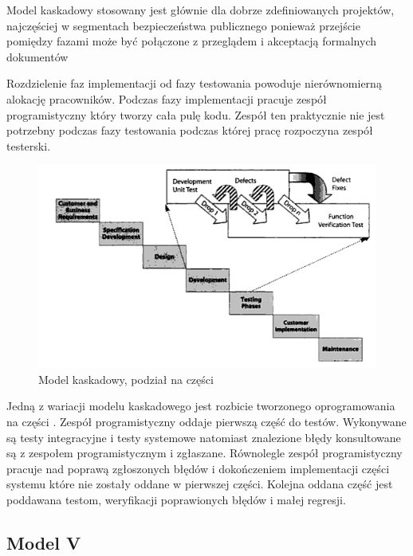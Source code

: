 Model kaskadowy stosowany jest głównie dla dobrze zdefiniowanych projektów, najczęściej w segmentach bezpieczeństwa publicznego ponieważ przejście pomiędzy fazami może być połączone z przeglądem i akceptacją formalnych dokumentów

Rozdzielenie faz implementacji od fazy testowania powoduje nierównomierną alokację pracowników. Podczas fazy implementacji pracuje zespół programistyczny który tworzy cała pulę kodu. Zespół ten praktycznie nie jest potrzebny podczas fazy testowania podczas której pracę rozpoczyna zespół testerski.
\begin{figure}[h]
\centerline{\includegraphics[scale=0.5]{img/water-wheel.png}}
\caption{Model kaskadowy, podział na części  \cite{TestingMatt}}
\label{fig:kaskadowyCzesci}
\end{figure}

Jedną z wariacji modelu kaskadowego jest rozbicie tworzonego oprogramowania na części \cite{TestingMatt}. 
Zespół programistyczny oddaje pierwszą część do testów. Wykonywane są testy integracyjne i testy systemowe natomiast znalezione błędy konsultowane są z zespołem programistycznym i zgłaszane. Równolegle zespół programistyczny pracuje nad poprawą zgłoszonych błędów i dokończeniem implementacji części systemu które nie zostały oddane w pierwszej części. Kolejna oddana część jest poddawana testom, weryfikacji poprawionych błędów i małej regresji.

\subsection{Model V}

